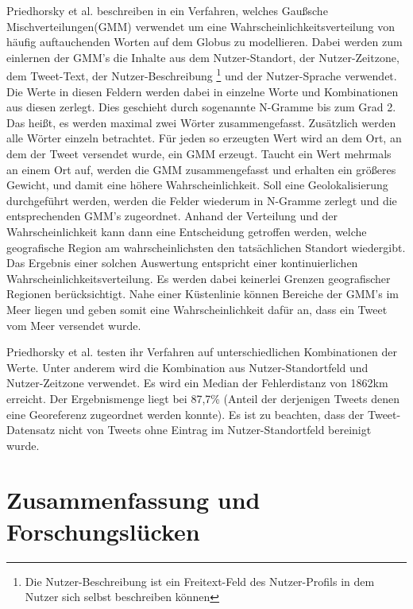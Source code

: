 		Priedhorsky et al. beschreiben in \cite{Priedhorsky2013} ein Verfahren, welches Gaußsche Mischverteilungen(GMM) verwendet um eine Wahrscheinlichkeitsverteilung von häufig auftauchenden Worten auf dem Globus zu modellieren.
		Dabei werden zum einlernen der GMM's die Inhalte aus dem Nutzer-Standort, der Nutzer-Zeitzone, dem Tweet-Text, der Nutzer-Beschreibung \footnote{Die Nutzer-Beschreibung ist ein Freitext-Feld des Nutzer-Profils in dem Nutzer sich selbst beschreiben können} und der Nutzer-Sprache verwendet.
		Die Werte in diesen Feldern werden dabei in einzelne Worte und Kombinationen aus diesen zerlegt.
		Dies geschieht durch sogenannte N-Gramme bis zum Grad 2. 
		Das heißt, es werden maximal zwei Wörter zusammengefasst.
		Zusätzlich werden alle Wörter einzeln betrachtet.
		Für jeden so erzeugten Wert wird an dem Ort, an dem der Tweet versendet wurde, ein GMM erzeugt.
		Taucht ein Wert mehrmals an einem Ort auf, werden die GMM zusammengefasst und erhalten ein größeres Gewicht, und damit eine höhere Wahrscheinlichkeit.
		Soll eine Geolokalisierung durchgeführt werden, werden die Felder wiederum in N-Gramme zerlegt und die entsprechenden GMM's zugeordnet. 
		Anhand der Verteilung und der Wahrscheinlichkeit kann dann eine Entscheidung getroffen werden, welche geografische Region am wahrscheinlichsten den tatsächlichen Standort wiedergibt. 
		Das Ergebnis einer solchen Auswertung entspricht einer kontinuierlichen Wahrscheinlichkeitsverteilung. 
		Es werden dabei keinerlei Grenzen geografischer Regionen berücksichtigt. 
		Nahe einer Küstenlinie können Bereiche der GMM's im Meer liegen und geben somit eine Wahrscheinlichkeit dafür an, dass ein Tweet vom Meer versendet wurde.  

		Priedhorsky et al. testen ihr Verfahren auf unterschiedlichen Kombinationen der Werte. 
		Unter anderem wird die Kombination aus Nutzer-Standortfeld und Nutzer-Zeitzone verwendet. 
		Es wird ein Median der Fehlerdistanz von 1862km erreicht. 
		Der Ergebnismenge liegt bei 87,7\% (Anteil der derjenigen Tweets denen eine Georeferenz zugeordnet werden konnte).
		Es ist zu beachten, dass der Tweet-Datensatz nicht von Tweets ohne Eintrag im Nutzer-Standortfeld bereinigt wurde. 


	\section{Zusammenfassung und Forschungslücken}

